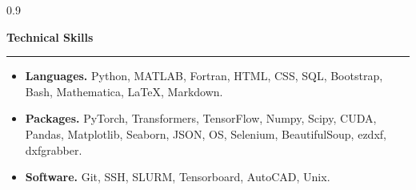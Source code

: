 \documentclass{article}
\begin{document}
\begin{spacing}{0.9}













\LARGE{\textbf{Technical Skills}}\normalsize \\[0.10cm]
\vspace{-0.2cm}
\noindent\rule{18.25cm}{0.7pt}

\small{ 
    \begin{itemize}[itemsep=0.1pt,parsep=0.1pt, topsep=0.1pt]
        \item \textbf{Languages.} Python, MATLAB, Fortran, HTML, CSS, SQL, Bootstrap, Bash, Mathematica, \LaTeX, Markdown.
        \item \textbf{Packages.} PyTorch, Transformers, TensorFlow, Numpy, Scipy, CUDA, Pandas, Matplotlib, Seaborn, JSON, OS, Selenium, BeautifulSoup, ezdxf, dxfgrabber.
        \item \textbf{Software.} Git, SSH, SLURM, Tensorboard, AutoCAD, Unix.
    \end{itemize}
}


\end{spacing}
\end{document}
